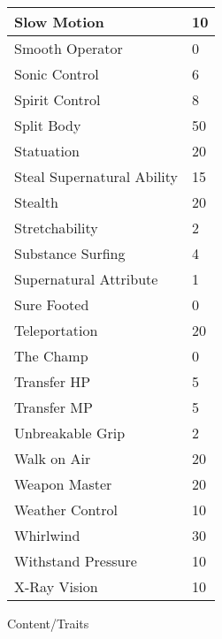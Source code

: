 \documentclass[twoside]{book}
\begin{document}
\begin{longtable}{p{1.25in}l}
  \raggedright
           Slow Motion 
  &
   10 
  \tabularnewline
  \hline
      
  \raggedright
           Smooth Operator 
  &
   0 
  \tabularnewline
  \hline
      
  \raggedright
           Sonic Control 
  &
   6 
  \tabularnewline
  \hline
      
  \raggedright
           Spirit Control 
  &
   8 
  \tabularnewline
  \hline
      
  \raggedright
           Split Body 
  &
   50 
  \tabularnewline
  \hline
      
  \raggedright
           Statuation 
  &
   20 
  \tabularnewline
  \hline
      
  \raggedright
           Steal Supernatural Ability
           
  &
   15 
  \tabularnewline
  \hline
      
  \raggedright
           Stealth 
  &
   20 
  \tabularnewline
  \hline
      
  \raggedright
           Stretchability 
  &
   2 
  \tabularnewline
  \hline
      
  \raggedright
           Substance Surfing 
  &
   4 
  \tabularnewline
  \hline
      
  \raggedright
           Supernatural Attribute 
  &
   1 
  \tabularnewline
  \hline
      
  \raggedright
           Sure Footed 
  &
   0 
  \tabularnewline
  \hline
      
  \raggedright
           Teleportation 
  &
   20 
  \tabularnewline
  \hline
      
  \raggedright
           The Champ 
  &
   0 
  \tabularnewline
  \hline
      
  \raggedright
           Transfer HP 
  &
   5 
  \tabularnewline
  \hline
      
  \raggedright
           Transfer MP 
  &
   5 
  \tabularnewline
  \hline
      
  \raggedright
           Unbreakable Grip 
  &
   2 
  \tabularnewline
  \hline
      
  \raggedright
           Walk on Air 
  &
   20 
  \tabularnewline
  \hline
      
  \raggedright
           Weapon Master 
  &
   20 
  \tabularnewline
  \hline
      
  \raggedright
           Weather Control 
  &
   10 
  \tabularnewline
  \hline
      
  \raggedright
           Whirlwind 
  &
   30 
  \tabularnewline
  \hline
      
  \raggedright
           Withstand Pressure 
  &
   10 
  \tabularnewline
  \hline
      
  \raggedright
           X-Ray Vision 
  &
   10 
  \tabularnewline
  \hline
      
\end{longtable}
    Content/Traits
\hspace{-2ex}
\end{document}
